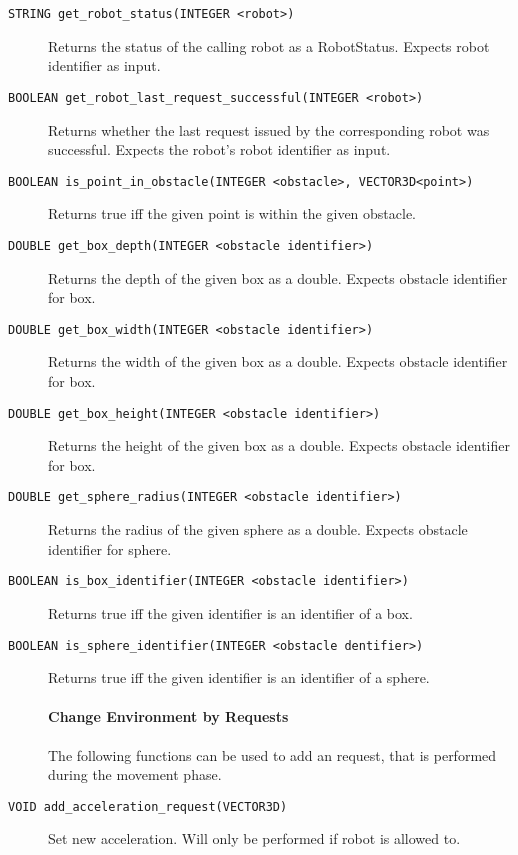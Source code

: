 \begin{description}
	\item [\texttt{STRING get\_robot\_status(INTEGER <robot>)}] 
		Returns the status of the calling robot as a RobotStatus. Expects robot identifier as input.
		
	\item [\texttt{BOOLEAN get\_robot\_last\_request\_successful(INTEGER <robot>)}] 
		Returns whether the last request issued by the corresponding robot was successful. Expects the robot's robot identifier as input.
		
	\item [\texttt{BOOLEAN is\_point\_in\_obstacle(INTEGER <obstacle>, VECTOR3D<point>)}] 
		Returns true iff the given point is within the given obstacle.
		
	\item [\texttt{DOUBLE get\_box\_depth(INTEGER <obstacle identifier>)}] 
		Returns the depth of the given box as a double. Expects obstacle identifier for box.
		
	\item [\texttt{DOUBLE get\_box\_width(INTEGER <obstacle identifier>)}] 
		Returns the width of the given box as a double. Expects obstacle identifier for box.
		
	\item [\texttt{DOUBLE get\_box\_height(INTEGER <obstacle identifier>)}] 
		Returns the height of the given box as a double. Expects obstacle identifier for box.
		
	\item [\texttt{DOUBLE get\_sphere\_radius(INTEGER <obstacle identifier>)}] 
		Returns the radius of the given sphere as a double. Expects obstacle identifier for sphere.
	
	\item [\texttt{BOOLEAN is\_box\_identifier(INTEGER <obstacle identifier>)}] 
		Returns true iff the given identifier is an identifier of a box.
		
	\item [\texttt{BOOLEAN is\_sphere\_identifier(INTEGER <obstacle dentifier>)}] 
		Returns true iff the given identifier is an identifier of a sphere.


\paragraph{Change Environment by Requests}	
The following functions can be used to add an request, that is performed during the movement phase.

	\item [\texttt{VOID add\_acceleration\_request(VECTOR3D)}] 
		Set new acceleration. Will only be performed if robot is allowed to.
		

\end{description}
